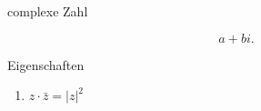 \documentclass[class=article, crop=false]{standalone}
\begin{document}
\begin{zettel}{complexe Zahl}
\begin{flashcard}[]{}
	\[
		a + bi
	.\]
\end{flashcard}
\begin{remark}
	Eigenschaften
	\begin{enumerate}
		\item $z \cdot  \bar{z} =  |z|^2 $

	\end{enumerate}

\end{remark}
\end{zettel}
\end{document}
